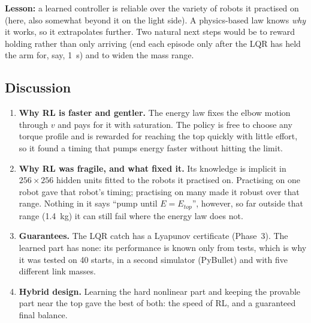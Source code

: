 \textbf{Lesson:} a learned controller is reliable over the variety of robots it practised on (here, also somewhat beyond it on the light side). A physics-based law knows \emph{why} it works, so it extrapolates further. Two natural next steps would be to reward holding rather than only arriving (end each episode only after the LQR has held the arm for, say, 1~s) and to widen the mass range.

\subsection{Discussion}
\begin{enumerate}
\item \textbf{Why RL is faster and gentler.} The energy law fixes the elbow motion through $v$ and pays for it with saturation. The policy is free to choose any torque profile and is rewarded for reaching the top quickly with little effort, so it found a timing that pumps energy faster without hitting the limit.
\item \textbf{Why RL was fragile, and what fixed it.} Its knowledge is implicit in $256\times256$ hidden units fitted to the robots it practised on. Practising on one robot gave that robot's timing; practising on many made it robust over that range. Nothing in it says ``pump until $E=E_{top}$'', however, so far outside that range (1.4~kg) it can still fail where the energy law does not.
\item \textbf{Guarantees.} The LQR catch has a Lyapunov certificate (Phase~3). The learned part has none: its performance is known only from tests, which is why it was tested on 40 starts, in a second simulator (PyBullet) and with five different link masses.
\item \textbf{Hybrid design.} Learning the hard nonlinear part and keeping the provable part near the top gave the best of both: the speed of RL, and a guaranteed final balance.
\end{enumerate}
